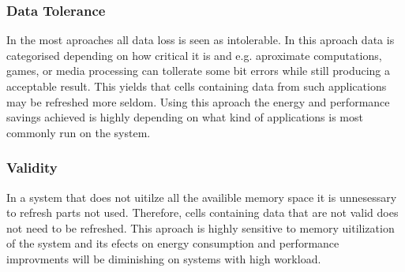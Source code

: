 
\subsubsection*{\textbf{Data Tolerance}}
In the most aproaches all data loss is seen as intolerable. In this aproach data is categorised depending on how critical it is and e.g. aproximate computations, games, or media processing can tollerate some bit errors while still producing a acceptable result. This yields that cells containing data from such applications may be refreshed more seldom. Using this aproach the energy and performance savings achieved is highly depending on what kind of applications is most commonly run on the system.


\subsubsection*{\textbf{Validity}}
In a system that does not uitilze all the availible memory space it is unnesessary to refresh parts not used. Therefore, cells containing data that are not valid does not need to be refreshed. This aproach is highly sensitive to memory uitilization of the system and its efects on energy consumption and performance improvments will be diminishing on systems with high workload.  


